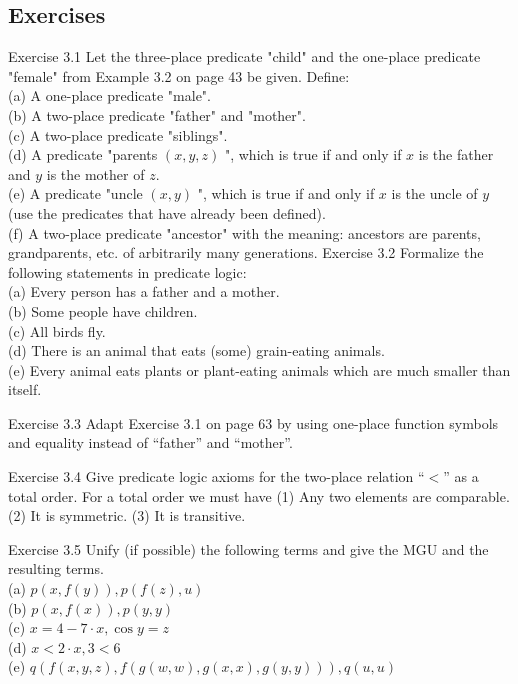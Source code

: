 \documentclass[10pt]{book}
\begin{document}
\subsection{Exercises}
Exercise 3.1 Let the three-place predicate "child" and the one-place predicate "female" from Example 3.2 on page 43 be given. Define:\\
(a) A one-place predicate "male".\\
(b) A two-place predicate "father" and "mother".\\
(c) A two-place predicate "siblings".\\
(d) A predicate "parents $(x, y, z)$ ", which is true if and only if $x$ is the father and $y$ is the mother of $z$.\\
(e) A predicate "uncle $(x, y)$ ", which is true if and only if $x$ is the uncle of $y$ (use the predicates that have already been defined).\\
(f) A two-place predicate "ancestor" with the meaning: ancestors are parents, grandparents, etc. of arbitrarily many generations.
Exercise 3.2 Formalize the following statements in predicate logic:\\
(a) Every person has a father and a mother.\\
(b) Some people have children.\\
(c) All birds fly.\\
(d) There is an animal that eats (some) grain-eating animals.\\
(e) Every animal eats plants or plant-eating animals which are much smaller than itself.

Exercise 3.3 Adapt Exercise 3.1 on page 63 by using one-place function symbols and equality instead of ``father'' and ``mother''.

Exercise 3.4 Give predicate logic axioms for the two-place relation ``$<$'' as a total order. For a total order we must have (1) Any two elements are comparable. (2) It is symmetric. (3) It is transitive.

Exercise 3.5 Unify (if possible) the following terms and give the MGU and the resulting terms.\\
(a) $p(x, f(y)), p(f(z), u)$\\
(b) $p(x, f(x)), p(y, y)$\\
(c) $x=4-7 \cdot x, \cos y=z$\\
(d) $x<2 \cdot x, 3<6$\\
(e) $q(f(x, y, z), f(g(w, w), g(x, x), g(y, y))), q(u, u)$
\end{document}
